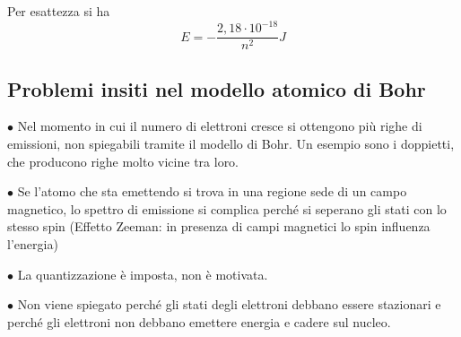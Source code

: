 Per esattezza si ha
$$E=-\frac{2,18\cdot10^{-18}}{n^2}J$$
\subsection{Problemi insiti nel modello atomico di Bohr}
$\bullet$ Nel momento in cui il numero di elettroni cresce si ottengono più righe di emissioni, non spiegabili tramite il modello di Bohr. Un esempio sono i doppietti, che producono righe molto vicine tra loro.

$\bullet$ Se l'atomo che sta emettendo si trova in una regione sede di un campo magnetico, lo spettro di emissione si complica perché si seperano gli stati con lo stesso spin
(Effetto Zeeman: in presenza di campi magnetici lo spin influenza l'energia)

$\bullet$ La quantizzazione è imposta, non è motivata.

$\bullet$ Non viene spiegato perché gli stati degli elettroni debbano essere stazionari e perché gli elettroni non debbano emettere energia e cadere sul nucleo.
\newpage
